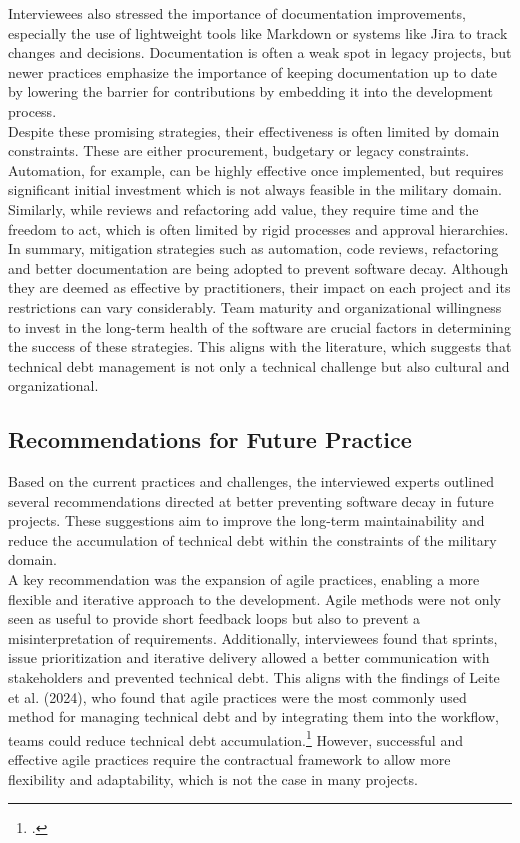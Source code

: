 Interviewees also stressed the importance of documentation improvements, especially the use of lightweight tools like Markdown or systems like Jira to track changes and decisions. Documentation is often a weak spot in legacy projects, but newer practices 
emphasize the importance of keeping documentation up to date by lowering the barrier for contributions by embedding it into the development process.\\

Despite these promising strategies, their effectiveness is often limited by domain constraints. These are either procurement, budgetary or legacy constraints. Automation, for example, can be highly effective once implemented, but requires significant initial investment which is not always feasible in the military domain.
Similarly, while reviews and refactoring add value, they require time and the freedom to act, which is often limited by rigid processes and approval hierarchies.\\

In summary, mitigation strategies such as automation, code reviews, refactoring and better documentation are being adopted to prevent software decay. Although they are deemed as effective by practitioners, their impact on each project and its restrictions can vary considerably. Team maturity and organizational
willingness to invest in the long-term health of the software are crucial factors in determining the success of these strategies. This aligns with the literature, which suggests that technical debt management is not only a technical challenge but also cultural and organizational.\\

\subsection{Recommendations for Future Practice}
Based on the current practices and challenges, the interviewed experts outlined several recommendations directed at better preventing software decay in future projects. These suggestions aim to improve the long-term maintainability
and reduce the accumulation of technical debt within the constraints of the military domain.\\

A key recommendation was the expansion of agile practices, enabling a more flexible and iterative approach to the development. Agile methods were not only seen as useful to provide short feedback loops but also to prevent a misinterpretation of requirements.
Additionally, interviewees found that sprints, issue prioritization and iterative delivery allowed a better communication with stakeholders and prevented technical debt.
This aligns with the findings of Leite et al. (2024), who found that agile practices were the most commonly used method for managing technical debt and by integrating them into the workflow, teams could reduce technical debt accumulation.\footcite[318]{leiteTechnicalDebtManagement2024}
However, successful and effective agile practices require the contractual framework to allow more flexibility and adaptability, which is not the case in many projects.\\

